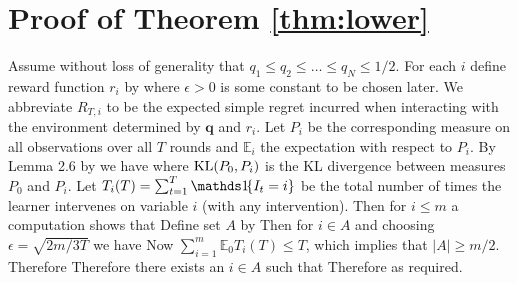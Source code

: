 \section{Proof of Theorem \ref{thm:lower}}\label{sec:thm:lower}

Assume without loss of generality that $q_1 \leq q_2 \leq \ldots \leq q_N \leq 1/2$.
For each $i$ define reward function $r_i$ by
where $\epsilon > 0$ is some constant to be chosen later.
We abbreviate $R_{T,i}$ to be the expected simple regret incurred when interacting with the
environment determined by $\boldsymbol{q}$ and $r_i$. Let $P_i$ be the corresponding measure
on all observations over all $T$ rounds and $\mathbb E_i$ the expectation with respect to $P_i$. By Lemma 2.6 by \cite{Tsy08} we have
where $\operatorname{KL}(P_0, P_i)$ is the KL divergence between measures $P_0$ and $P_i$.
Let $T_i(T) = \sum_{t=1}^T \ind{I_t = i}$ be the total number of times the learner intervenes on variable $i$ (with any intervention). 
Then for $i \leq m$ a computation shows that 
Define set $A$ by
Then for $i \in A$ and choosing $\epsilon = \sqrt{2m/3T}$ we have
Now $\sum_{i=1}^m \mathbb E_0 T_i(T) \leq T$, which implies that $|A| \geq m/2$.
Therefore
Therefore there exists an $i \in A$ such that
Therefore
as required.










